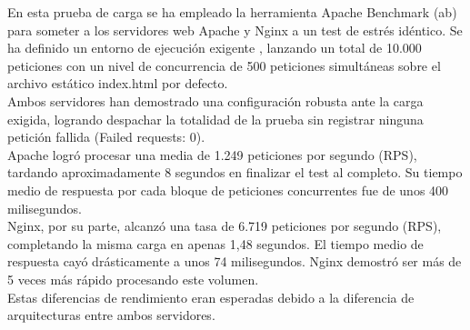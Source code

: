 \documentclass[12pt, a4paper]{article}
\begin{document}
En esta prueba de carga se ha empleado la herramienta Apache Benchmark (ab) para someter a los 
servidores web Apache y Nginx a un test de estrés idéntico. Se ha definido un entorno de ejecución exigente , 
lanzando un total de 10.000 peticiones con un nivel de concurrencia de 500 peticiones simultáneas 
sobre el archivo estático index.html por defecto. 
\\
Ambos servidores han demostrado una configuración robusta ante la carga exigida, 
logrando despachar la totalidad de la prueba sin registrar ninguna petición fallida (Failed requests: 0).
\\
Apache logró procesar una media de 1.249 peticiones por segundo (RPS), tardando aproximadamente 8 segundos en 
finalizar el test al completo. Su tiempo medio de respuesta por cada bloque de peticiones concurrentes fue de unos 
400 milisegundos.
\\
Nginx, por su parte, alcanzó una tasa de 6.719 peticiones por segundo (RPS), completando la misma carga en apenas 
1,48 segundos. El tiempo medio de respuesta cayó drásticamente a unos 74 milisegundos. 
Nginx demostró ser más de 5 veces más rápido procesando este volumen.
\\
Estas diferencias de rendimiento eran esperadas debido a la diferencia de arquitecturas entre ambos servidores.
\end{document}
